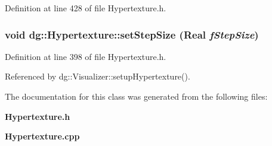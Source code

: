 Definition at line 428 of file Hypertexture.h.
\subsubsection{\setlength{\rightskip}{0pt plus 5cm}void dg::Hypertexture::set\-Step\-Size ({\bf Real} {\em f\-Step\-Size})\hspace{0.3cm}{\tt  [inline]}}\label{classdg_1_1Hypertexture_a38}




Definition at line 398 of file Hypertexture.h.

Referenced by dg::Visualizer::setup\-Hypertexture().

The documentation for this class was generated from the following files:\begin{CompactItemize}
\item 
{\bf Hypertexture.h}\item 
{\bf Hypertexture.cpp}\end{CompactItemize}
